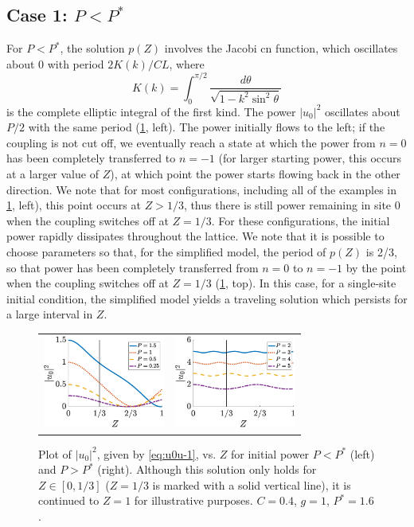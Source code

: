 \documentclass[reprint, amsmath,amssymb,aps,pre]{revtex4-2}
\begin{document}
\subsection{\texorpdfstring{Case 1: $P < P^*$}{Case 1: P < Pstar}}

For $P < P^*$, the solution $p(Z)$ involves the Jacobi cn function, which oscillates about 0 with period $2K(k)/CL$, where
\begin{equation}\label{eq:Kellipticint}
K(k) = \int_0^{\pi/2} \frac{d\theta}{\sqrt{1-k^2 \sin^2 \theta}}
\end{equation}
is the complete elliptic integral of the first kind. The power $|u_0|^2$ oscillates about $P/2$ with the same period (\cref{fig:simplemodel1}, left). The power initially flows to the left; if the coupling is not cut off, we eventually reach a state at which the power from $n=0$ has been completely transferred to $n=-1$ (for larger starting power, this occurs at a larger value of $Z$), at which point the power starts flowing back in the other direction. We note that for most configurations, including all of the examples in \cref{fig:simplemodel1}, left), this point occurs at $Z>1/3$, thus there is still power remaining in site 0 when the coupling switches off at $Z=1/3$. For these configurations, the initial power rapidly dissipates throughout the lattice. We note that it is possible to choose parameters so that, for the simplified model, the period of $p(Z)$ is 2/3, so that power has been completely transferred from $n=0$ to $n=-1$ by the point when the coupling switches off at $Z=1/3$ (\cref{fig:simplemodel1}, top). In this case, for a single-site initial condition, the simplified model yields a traveling solution  which persists for a large interval in $Z$.

\begin{figure}
    \centering
    \begin{tabular}{cc}
    \includegraphics[width=4cm]{plotCN.eps} &
    \includegraphics[width=4cm]{plotDN.eps}
    \end{tabular}
    \caption{Plot of $|u_0|^2$, given by \cref{eq:u0u-1}, vs. $Z$ for initial power $P<P^*$ (left) and $P>P^*$ (right). Although this solution only holds for $Z \in [0, 1/3]$ ($Z=1/3$ is marked with a solid vertical line), it is continued to $Z=1$ for illustrative purposes. $C=0.4$, $g=1$, $P^* = 1.6$.}
    \label{fig:simplemodel1}
\end{figure}
\end{document}
